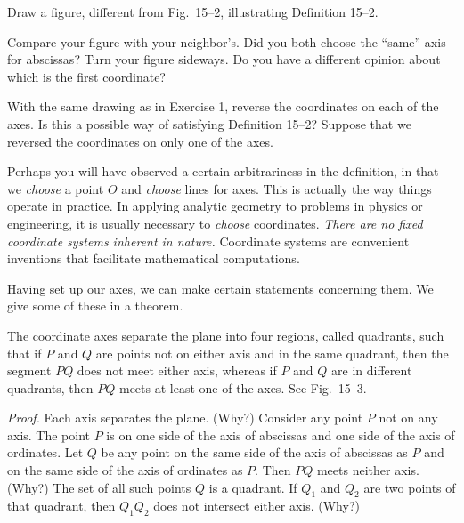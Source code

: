 \documentclass[11pt]{book}
\theoremstyle{bkplain}
\theoremstyle{XIplainnote}
\theoremstyle{bkplain}
\theoremstyle{bkplain}
\begin{document}
\FIGXVTWO

\begin{exercisecols}
\begin{exlist}
\item Draw a figure, different from Fig.~15--2, illustrating Definition
  15--2.
\item Compare your figure with your neighbor's. Did you both choose the
  ``same'' axis for abscissas? Turn your figure sideways. Do you have a
  different opinion about which is the first coordinate?
\item With the same drawing as in Exercise 1, reverse the coordinates on each
  of the axes. Is this a possible way of satisfying Definition 15--2? Suppose
  that we reversed the coordinates on only one of the axes.
\end{exlist}
\end{exercisecols}

Perhaps you will have observed a certain arbitrariness in the definition, in
that we \emph{choose} a point $O$ and \emph{choose} lines for axes. This is
actually the way things operate in practice. In applying analytic geometry to
problems in physics or engineering, it is usually necessary to \emph{choose}
coordinates. \emph{There are no fixed coordinate systems inherent in nature.}
Coordinate systems are convenient inventions that facilitate mathematical
computations.

Having set up our axes, we can make certain statements concerning them. We
give some of these in a theorem.

\begin{theorem}
The coordinate axes separate the plane into four regions, called quadrants,
such that if $P$ and $Q$ are points not on either axis and in the same
quadrant, then the segment $PQ$ does not meet either axis, whereas if $P$ and
$Q$ are in different quadrants, then $PQ$ meets at least one of the axes. See
Fig.~15--3.
\end{theorem}

\FIGXVTHREE

\noindent\emph{Proof.}
Each axis separates the plane. (Why?) Consider any point $P$ not on any axis.
The point $P$ is on one side of the axis of abscissas and one side of the axis
of ordinates. Let $Q$ be any point on the same side of the axis of abscissas
as $P$ and on the same side of the axis of ordinates as $P$. Then $PQ$ meets
neither axis. (Why?) The set of all such points $Q$ is a quadrant. If $Q_1$
and $Q_2$ are two points of that quadrant, then $Q_1Q_2$ does not intersect
either axis. (Why?)
\end{document}
